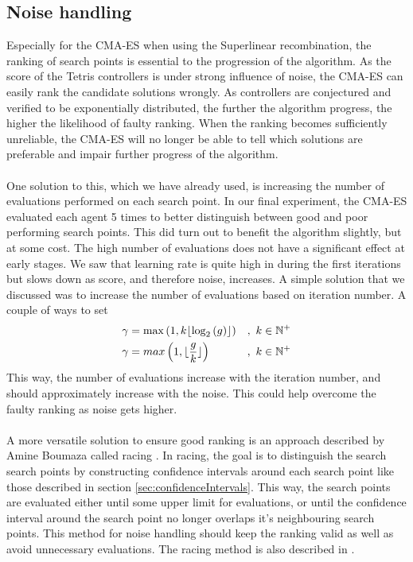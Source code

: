 \subsection{Noise handling}

Especially for the CMA-ES when using the Superlinear recombination, the ranking of search
points is essential to the progression of the algorithm. As the score of the Tetris controllers
is under strong influence of noise, the CMA-ES can easily rank the 
candidate solutions wrongly. As controllers are conjectured and verified to
be exponentially distributed, the further the algorithm progress, the higher the likelihood
of faulty ranking. When the ranking becomes sufficiently unreliable, the CMA-ES will
no longer be able to tell which solutions are preferable and impair further progress
of the algorithm.\\
\\
One solution to this, which we have already used, is increasing the number of evaluations
performed on each search point. In our final experiment, the CMA-ES evaluated each agent
5 times to better distinguish between good and poor performing search points. This did turn out
to benefit the algorithm slightly, but at some cost. The high number of evaluations does not have a
significant effect at early stages. We saw that learning rate is quite high in during the first 
iterations but slows down as score, and therefore noise, increases. A simple solution
that we discussed  was to increase the number of evaluations based on iteration number.
A couple of ways to set 
\begin{align}
\gamma &=  \max\left( 1, k \lfloor \log_{2} \left( g \right)  \rfloor \right) &,\ k \in \mathbb{N}^+\\
\gamma &=  max\left( 1, \lfloor \frac{g}{k} \rfloor \right) &,\ k \in \mathbb{N}^+
\end{align}
This way, the number of evaluations increase with the iteration number, and should approximately
increase with the noise. This could help overcome the faulty ranking as noise gets higher.\\
\\
A more versatile solution to ensure good ranking is an approach described by
Amine Boumaza called racing \citep{boumaza2011:b}. In racing, the goal is to 
distinguish the search search points by constructing confidence intervals around each
search point like those described in section \ref{sec:confidenceIntervals}.
This way, the search points are evaluated either until some upper limit for evaluations,
or until the confidence interval around the search point no longer overlaps it's
neighbouring search points. This method for noise handling should keep the ranking 
valid as well as avoid unnecessary evaluations. The racing method is also described in 
\citep{heidrich-meisner:09c}.


